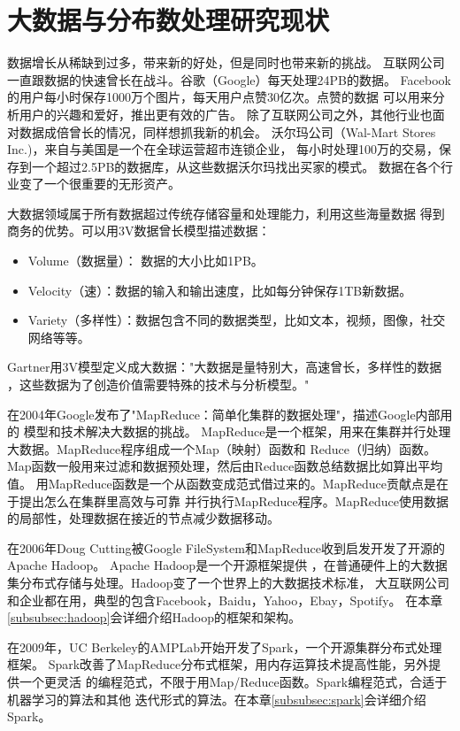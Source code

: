 \section{大数据与分布数处理研究现状}
\label{subsec:bigdata_background}
数据增长从稀缺到过多，带来新的好处，但是同时也带来新的挑战。
互联网公司一直跟数据的快速曾长在战斗。谷歌（Google）每天处理24PB的数据。
Facebook的用户每小时保存1000万个图片，每天用户点赞30亿次。点赞的数据
可以用来分析用户的兴趣和爱好，推出更有效的广告。
除了互联网公司之外，其他行业也面对数据成倍曾长的情况，同样想抓我新的机会。
沃尔玛公司（Wal-Mart Stores Inc.)，来自与美国是一个在全球运营超市连锁企业，
每小时处理100万的交易，保存到一个超过2.5PB的数据库，从这些数据沃尔玛找出买家的模式。
数据在各个行业变了一个很重要的无形资产。\cite{mayer2013bigdata}

大数据领域属于所有数据超过传统存储容量和处理能力，利用这些海量数据
得到商务的优势。可以用3V数据曾长模型描述数据：
\begin{itemize}
  \item Volume（数据量）： 数据的大小比如1PB。
  \item Velocity（速）：数据的输入和输出速度，比如每分钟保存1TB新数据。
  \item Variety（多样性）：数据包含不同的数据类型，比如文本，视频，图像，社交网络等等。
\end{itemize}
Gartner用3V模型定义成大数据："大数据是量特别大，高速曾长，多样性的数据
，这些数据为了创造价值需要特殊的技术与分析模型。"\cite{bigdatadefinition}

在2004年Google发布了"MapReduce：简单化集群的数据处理"，描述Google内部用的
模型和技术解决大数据的挑战。\cite{dean2008mapreduce}
MapReduce是一个框架，用来在集群并行处理大数据。MapReduce程序组成一个Map（映射）函数和
Reduce（归纳）函数。Map函数一般用来过滤和数据预处理，然后由Reduce函数总结数据比如算出平均值。
用MapReduce函数是一个从函数变成范式借过来的。MapReduce贡献点是在于提出怎么在集群里高效与可靠
并行执行MapReduce程序。MapReduce使用数据的局部性，处理数据在接近的节点减少数据移动。

在2006年Doug Cutting被Google FileSystem和MapReduce收到启发开发了开源的Apache Hadoop。
\cite{gfs2003, dean2008mapreduce, wiki:hadoop}Apache Hadoop是一个开源框架提供
，在普通硬件上的大数据集分布式存储与处理。Hadoop变了一个世界上的大数据技术标准，
大互联网公司和企业都在用，典型的包含Facebook，Baidu，Yahoo，Ebay，Spotify。
在本章\ref{subsubsec:hadoop}会详细介绍Hadoop的框架和架构。

在2009年，UC Berkeley的AMPLab开始开发了Spark，一个开源集群分布式处理框架。\cite{wiki:spark}
Spark改善了MapReduce分布式框架，用内存运算技术提高性能，另外提供一个更灵活
的编程范式，不限于用Map/Reduce函数。Spark编程范式，合适于机器学习的算法和其他
迭代形式的算法。在本章\ref{subsubsec:spark}会详细介绍Spark。



